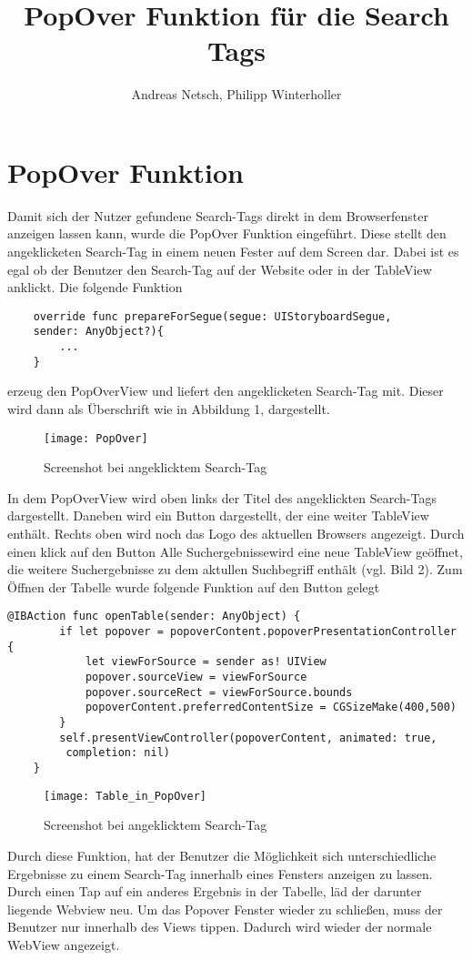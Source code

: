 
\title{PopOver Funktion für die Search Tags}
\author{Andreas Netsch, Philipp Winterholler}

\section{PopOver Funktion}

Damit sich der Nutzer gefundene Search-Tags direkt in dem Browserfenster anzeigen lassen kann, wurde die PopOver Funktion eingeführt. Diese stellt den angeklicketen Search-Tag in einem neuen Fester auf dem Screen dar. Dabei ist es egal ob der Benutzer den Search-Tag auf der Website oder in der TableView anklickt.
Die folgende Funktion 
\begin{lstlisting}
    override func prepareForSegue(segue: UIStoryboardSegue, 
    sender: AnyObject?){
        ...
    }
\end{lstlisting}

erzeug den PopOverView und liefert den angeklicketen Search-Tag mit. Dieser wird dann als Überschrift wie in Abbildung 1, dargestellt. 
\begin{figure}[htb]
    \centering
    \texttt{[image: PopOver]}
    \caption{Screenshot bei angeklicktem Search-Tag}
\end{figure}
In dem PopOverView wird oben links der Titel des angeklickten Search-Tags dargestellt. Daneben wird ein Button dargestellt, der eine weiter TableView enthält. Rechts oben wird noch das Logo des aktuellen Browsers angezeigt. Durch einen klick auf den Button \glqq Alle Suchergebnisse\grqq  wird eine neue TableView geöffnet, die weitere Suchergebnisse zu dem aktullen Suchbegriff enthält (vgl. Bild 2). Zum Öffnen der Tabelle wurde folgende Funktion auf den Button gelegt
\begin{lstlisting}
@IBAction func openTable(sender: AnyObject) {
        if let popover = popoverContent.popoverPresentationController {
            let viewForSource = sender as! UIView
            popover.sourceView = viewForSource
            popover.sourceRect = viewForSource.bounds
            popoverContent.preferredContentSize = CGSizeMake(400,500)
        }        
        self.presentViewController(popoverContent, animated: true,
         completion: nil)
    }
\end{lstlisting}
\begin{figure}[htb]
    \centering
    \texttt{[image: Table\_in\_PopOver]}
    \caption{Screenshot bei angeklicktem Search-Tag}
\end{figure}
Durch diese Funktion, hat der Benutzer die Möglichkeit sich unterschiedliche Ergebnisse zu einem Search-Tag innerhalb eines Fensters anzeigen zu lassen. Durch einen Tap auf ein anderes Ergebnis in der Tabelle, läd der darunter liegende Webview neu. Um das Popover Fenster wieder zu schließen, muss der Benutzer nur innerhalb des Views tippen. Dadurch wird wieder der normale WebView angezeigt.
